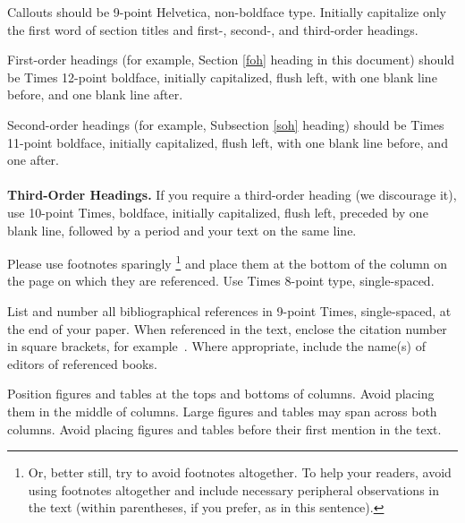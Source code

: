 \documentclass[10pt,twocolumn]{article}
\begin{document}
\noindent Callouts should be 9-point Helvetica, non-boldface type.
Initially capitalize only the first word of section titles and first-,
second-, and third-order headings.

 \label{foh}

First-order headings (for example, Section \ref{foh} heading in this
document) should be Times 12-point boldface, initially capitalized,
flush left, with one blank line before, and one blank line after.

 \label{soh}

Second-order headings (for example, Subsection \ref{soh} heading)
should be Times 11-point boldface, initially capitalized, flush
left, with one blank line before, and one after.\\~\\
\textbf{Third-Order Headings.} If you require a third-order heading
(we discourage it), use 10-point Times, boldface, initially
capitalized, flush left, preceded by one blank line, followed by a
period and your text on the same line.


Please use footnotes sparingly%
\footnote
   {%
     Or, better still, try to avoid footnotes altogether.  To help your
     readers, avoid using footnotes altogether and include necessary
     peripheral observations in the text (within parentheses, if you
     prefer, as in this sentence).
   }
and place them at the bottom of the column on the page on which they are
referenced. Use Times 8-point type, single-spaced.



List and number all bibliographical references in 9-point Times,
single-spaced, at the end of your paper. When referenced in the
text, enclose the citation number in square brackets, for
example~\cite{KwA98,NoS91,TkB99}. Where appropriate, include the
name(s) of editors of referenced books.


Position figures and tables at the tops and bottoms of columns.
Avoid placing them in the middle of columns. Large figures and
tables may span across both columns. Avoid placing figures and
tables before their first mention in the text.
\end{document}
